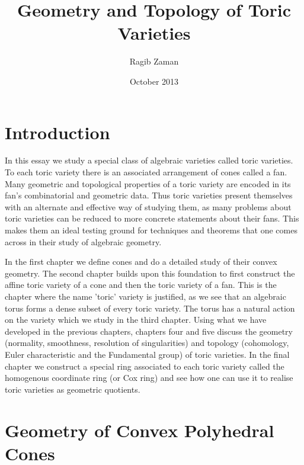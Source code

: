 \documentclass[BSc]{usydthesis}
\author{Ragib Zaman}
\title{Geometry and Topology of Toric Varieties}
\date{October 2013}
\numberwithin{equation}{chapter}
\theoremstyle{remark}
\begin{document}
  
\maketitle          %
\tableofcontents    %


\chapter*{Introduction} 
In this essay we study a special class of algebraic varieties called toric varieties. To each toric variety there is an associated arrangement of cones called a fan. Many geometric and topological properties of a toric variety are encoded in its fan's combinatorial and geometric data. Thus toric varieties present themselves with an alternate and effective way of studying them, as many problems about toric varieties can be reduced to more concrete statements about their fans. This makes them an ideal testing ground for techniques and theorems that one comes across in their study of algebraic geometry.

In the first chapter we define cones and do a detailed study of their convex geometry. The second chapter builds upon this foundation to first construct the affine toric variety of a cone and then the toric variety of a fan. This is the chapter where the name 'toric' variety is justified, as we see that an algebraic torus forms a dense subset of every toric variety. The torus has a natural action on the variety which we study in the third chapter. Using what we have developed in the previous chapters, chapters four and five discuss the geometry (normality, smoothness, resolution of singularities) and topology (cohomology, Euler characteristic and the Fundamental group) of toric varieties. In the final chapter we construct a special ring associated to each toric variety called the homogenous coordinate ring (or Cox ring) and see how one can use it to realise toric varieties as geometric quotients. 

\newpage\setcounter{page}{1}


\chapter{Geometry of Convex Polyhedral Cones}
\end{document}
